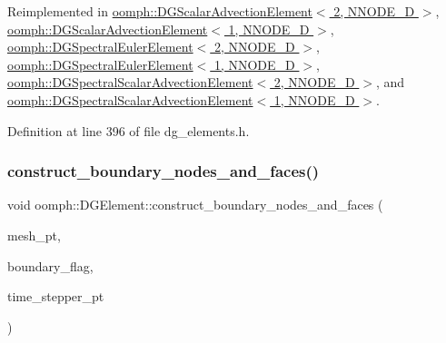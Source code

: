 Reimplemented in \hyperlink{classoomph_1_1DGScalarAdvectionElement_3_012_00_01NNODE__1D_01_4_a929abefd370881945240338a03265d99}{oomph\+::\+D\+G\+Scalar\+Advection\+Element$<$ 2, N\+N\+O\+D\+E\+\_\+D $>$}, \hyperlink{classoomph_1_1DGScalarAdvectionElement_3_011_00_01NNODE__1D_01_4_ae516160e4873adc0e599394db991a507}{oomph\+::\+D\+G\+Scalar\+Advection\+Element$<$ 1, N\+N\+O\+D\+E\+\_\+D $>$}, \hyperlink{classoomph_1_1DGSpectralEulerElement_3_012_00_01NNODE__1D_01_4_a4eba89afa9c9a037b77f9ed4ccbc766b}{oomph\+::\+D\+G\+Spectral\+Euler\+Element$<$ 2, N\+N\+O\+D\+E\+\_\+D $>$}, \hyperlink{classoomph_1_1DGSpectralEulerElement_3_011_00_01NNODE__1D_01_4_a7b5fa56b6e4bf604d6c3f21c126c0781}{oomph\+::\+D\+G\+Spectral\+Euler\+Element$<$ 1, N\+N\+O\+D\+E\+\_\+D $>$}, \hyperlink{classoomph_1_1DGSpectralScalarAdvectionElement_3_012_00_01NNODE__1D_01_4_a7f8e67d242b7a4967cf9bab98486e974}{oomph\+::\+D\+G\+Spectral\+Scalar\+Advection\+Element$<$ 2, N\+N\+O\+D\+E\+\_\+D $>$}, and \hyperlink{classoomph_1_1DGSpectralScalarAdvectionElement_3_011_00_01NNODE__1D_01_4_a39a30e2966dde6acf1eb44d58ce0013a}{oomph\+::\+D\+G\+Spectral\+Scalar\+Advection\+Element$<$ 1, N\+N\+O\+D\+E\+\_\+D $>$}.



Definition at line 396 of file dg\+\_\+elements.\+h.

\mbox{\label{classoomph_1_1DGElement_aa04768b9b6e6b929c070c6c1c9fc4372}} 
\subsubsection{\texorpdfstring{construct\+\_\+boundary\+\_\+nodes\+\_\+and\+\_\+faces()}{construct\_boundary\_nodes\_and\_faces()}}
{\footnotesize\ttfamily void oomph\+::\+D\+G\+Element\+::construct\+\_\+boundary\+\_\+nodes\+\_\+and\+\_\+faces (\begin{DoxyParamCaption}\item[{\hyperlink{classoomph_1_1DGMesh}{D\+G\+Mesh} $\ast$const \&}]{mesh\+\_\+pt,  }\item[{std\+::vector$<$ bool $>$ \&}]{boundary\+\_\+flag,  }\item[{\hyperlink{classoomph_1_1TimeStepper}{Time\+Stepper} $\ast$const \&}]{time\+\_\+stepper\+\_\+pt }\end{DoxyParamCaption})\hspace{0.3cm}{\ttfamily [inline]}}



